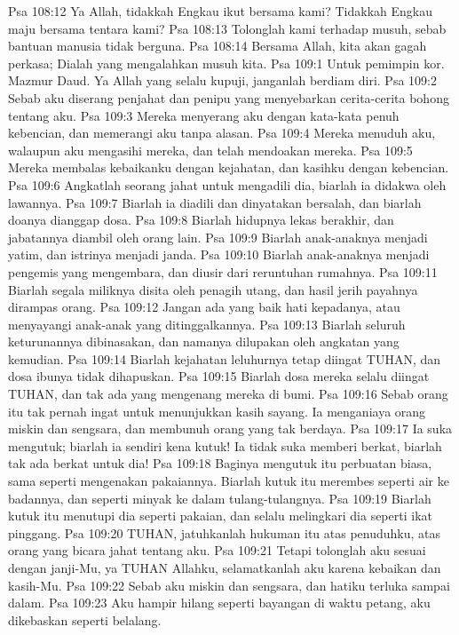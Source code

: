Psa 108:12  Ya Allah, tidakkah Engkau ikut bersama kami? Tidakkah Engkau maju bersama tentara kami?
Psa 108:13  Tolonglah kami terhadap musuh, sebab bantuan manusia tidak berguna.
Psa 108:14  Bersama Allah, kita akan gagah perkasa; Dialah yang mengalahkan musuh kita.
Psa 109:1  Untuk pemimpin kor. Mazmur Daud. Ya Allah yang selalu kupuji, janganlah berdiam diri.
Psa 109:2  Sebab aku diserang penjahat dan penipu yang menyebarkan cerita-cerita bohong tentang aku.
Psa 109:3  Mereka menyerang aku dengan kata-kata penuh kebencian, dan memerangi aku tanpa alasan.
Psa 109:4  Mereka menuduh aku, walaupun aku mengasihi mereka, dan telah mendoakan mereka.
Psa 109:5  Mereka membalas kebaikanku dengan kejahatan, dan kasihku dengan kebencian.
Psa 109:6  Angkatlah seorang jahat untuk mengadili dia, biarlah ia didakwa oleh lawannya.
Psa 109:7  Biarlah ia diadili dan dinyatakan bersalah, dan biarlah doanya dianggap dosa.
Psa 109:8  Biarlah hidupnya lekas berakhir, dan jabatannya diambil oleh orang lain.
Psa 109:9  Biarlah anak-anaknya menjadi yatim, dan istrinya menjadi janda.
Psa 109:10  Biarlah anak-anaknya menjadi pengemis yang mengembara, dan diusir dari reruntuhan rumahnya.
Psa 109:11  Biarlah segala miliknya disita oleh penagih utang, dan hasil jerih payahnya dirampas orang.
Psa 109:12  Jangan ada yang baik hati kepadanya, atau menyayangi anak-anak yang ditinggalkannya.
Psa 109:13  Biarlah seluruh keturunannya dibinasakan, dan namanya dilupakan oleh angkatan yang kemudian.
Psa 109:14  Biarlah kejahatan leluhurnya tetap diingat TUHAN, dan dosa ibunya tidak dihapuskan.
Psa 109:15  Biarlah dosa mereka selalu diingat TUHAN, dan tak ada yang mengenang mereka di bumi.
Psa 109:16  Sebab orang itu tak pernah ingat untuk menunjukkan kasih sayang. Ia menganiaya orang miskin dan sengsara, dan membunuh orang yang tak berdaya.
Psa 109:17  Ia suka mengutuk; biarlah ia sendiri kena kutuk! Ia tidak suka memberi berkat, biarlah tak ada berkat untuk dia!
Psa 109:18  Baginya mengutuk itu perbuatan biasa, sama seperti mengenakan pakaiannya. Biarlah kutuk itu merembes seperti air ke badannya, dan seperti minyak ke dalam tulang-tulangnya.
Psa 109:19  Biarlah kutuk itu menutupi dia seperti pakaian, dan selalu melingkari dia seperti ikat pinggang.
Psa 109:20  TUHAN, jatuhkanlah hukuman itu atas penuduhku, atas orang yang bicara jahat tentang aku.
Psa 109:21  Tetapi tolonglah aku sesuai dengan janji-Mu, ya TUHAN Allahku, selamatkanlah aku karena kebaikan dan kasih-Mu.
Psa 109:22  Sebab aku miskin dan sengsara, dan hatiku terluka sampai dalam.
Psa 109:23  Aku hampir hilang seperti bayangan di waktu petang, aku dikebaskan seperti belalang.
